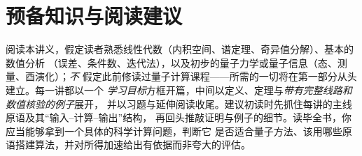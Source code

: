 \section*{预备知识与阅读建议}

阅读本讲义，假定读者熟悉线性代数（内积空间、谱定理、奇异值分解）、基本的数值分析
（误差、条件数、迭代法），以及初步的量子力学或量子信息（态、测量、酉演化）；\emph{不}
假定此前修读过量子计算课程——所需的一切将在第一部分从头建立。每一讲都以一个
\emph{学习目标}方框开篇，中间以定义、定理与\emph{带有完整线路和数值核验的例子}展开，
并以习题与延伸阅读收尾。建议初读时先抓住每讲的主线原语及其``输入--计算--输出''结构，
再回头推敲证明与例子的细节。读毕全书，你应当能够拿到一个具体的科学计算问题，判断它
是否适合量子方法、该用哪些原语搭建算法，并对所得加速给出有依据而非夸大的评估。
